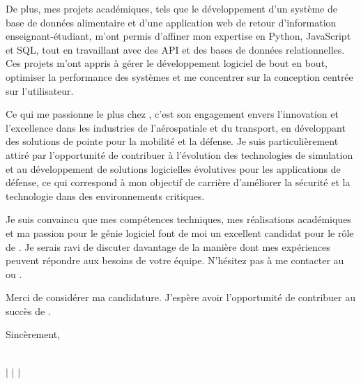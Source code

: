 \documentclass[10pt]{article}
\begin{document}
De plus, mes projets académiques, tels que le développement d'un système de base de données alimentaire et d'une application web de retour d'information enseignant-étudiant, m'ont permis d'affiner mon expertise en Python, JavaScript et SQL, tout en travaillant avec des API et des bases de données relationnelles. Ces projets m'ont appris à gérer le développement logiciel de bout en bout, optimiser la performance des systèmes et me concentrer sur la conception centrée sur l'utilisateur.

Ce qui me passionne le plus chez \company, c'est son engagement envers l'innovation et l'excellence dans les industries de l'aérospatiale et du transport, en développant des solutions de pointe pour la mobilité et la défense. Je suis particulièrement attiré par l'opportunité de contribuer à l'évolution des technologies de simulation et au développement de solutions logicielles évolutives pour les applications de défense, ce qui correspond à mon objectif de carrière d'améliorer la sécurité et la technologie dans des environnements critiques.

Je suis convaincu que mes compétences techniques, mes réalisations académiques et ma passion pour le génie logiciel font de moi un excellent candidat pour le rôle de \position. Je serais ravi de discuter davantage de la manière dont mes expériences peuvent répondre aux besoins de votre équipe. N'hésitez pas à me contacter au \href{tel:+15149445977}{\phone} ou \href{mailto:massimo02caruso@gmail.com}{\email}.

\vspace{1.5em}
Merci de considérer ma candidature. J'espère avoir l'opportunité de contribuer au succès de \company.

\vspace{2em}
Sincèrement, \\
\fullname

\newpage

\begin{center}
    {\Huge \textbf{\fullname}} \\
    \vspace{1mm}
    {\small 
    \faPhone \hspace{0mm} \href{tel:+15149445977}{\phone} $\vert$ 
    \faEnvelope \hspace{0mm} \href{mailto:massimo02caruso@gmail.com}{\email} $\vert$ 
    \faLinkedin \hspace{0mm} \href{https://linkedin.com/in/massimocaruso}{\linkedin} $\vert$ 
    \faGithub \hspace{0mm} \href{https://github.com/Extinctable}{\github}
    }
\end{center}
\end{document}
